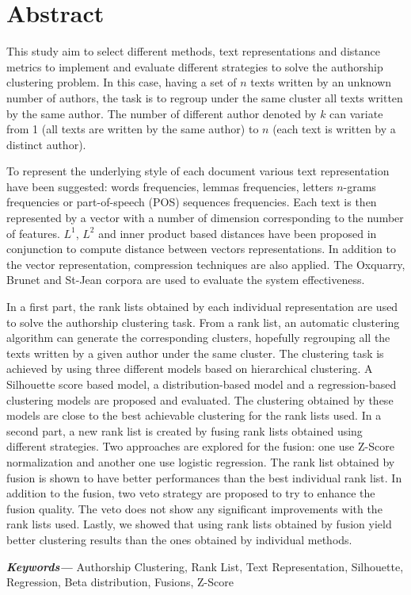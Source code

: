 \vspace*{\fill}
\chapter*{\centering Abstract}
This study aim to select different methods, text representations and distance metrics to implement and evaluate different strategies to solve the authorship clustering problem.
In this case, having a set of $n$ texts written by an unknown number of authors, the task is to regroup under the same cluster all texts written by the same author.
The number of different author denoted by $k$ can variate from 1 (all texts are written by the same author) to $n$ (each text is written by a distinct author).

To represent the underlying style of each document various text representation have been suggested: words frequencies, lemmas frequencies, letters $n$-grams frequencies or part-of-speech (POS) sequences frequencies.
Each text is then represented by a vector with a number of dimension corresponding to the number of features.
$L^1$, $L^2$ and inner product based distances have been proposed in conjunction to compute distance between vectors representations.
In addition to the vector representation, compression techniques are also applied.
The Oxquarry, Brunet and St-Jean corpora are used to evaluate the system effectiveness.

In a first part, the rank lists obtained by each individual representation are used to solve the authorship clustering task.
From a rank list, an automatic clustering algorithm can generate the corresponding clusters, hopefully regrouping all the texts written by a given author under the same cluster.
The clustering task is achieved by using three different models based on hierarchical clustering.
A Silhouette score based model, a distribution-based model and a regression-based clustering models are proposed and evaluated.
The clustering obtained by these models are close to the best achievable clustering for the rank lists used.
In a second part, a new rank list is created by fusing rank lists obtained using different strategies.
Two approaches are explored for the fusion: one use Z-Score normalization and another one use logistic regression.
The rank list obtained by fusion is shown to have better performances than the best individual rank list.
In addition to the fusion, two veto strategy are proposed to try to enhance the fusion quality.
The veto does not show any significant improvements with the rank lists used.
Lastly, we showed that using rank lists obtained by fusion yield better clustering results than the ones obtained by individual methods.


{\small \textbf{\textit{Keywords---}} Authorship Clustering, Rank List, Text Representation, Silhouette, Regression, Beta distribution, Fusions, Z-Score}

\vspace*{\fill}
